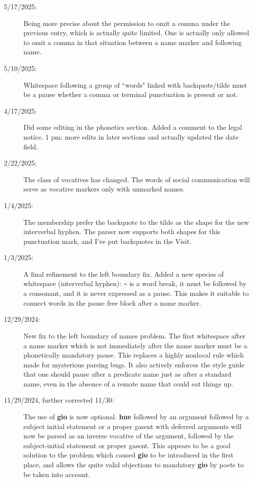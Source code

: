 \documentclass[12pt]{book}
\begin{document}
\begin{description}

\item[5/17/2025:]  Being more precise about the permission to omit a comma under the previous entry, which is actually quite limited.  One is actually only allowed to omit a comma in that situation between a name marker and following name.

\item[5/10/2025:]  Whitespace following a group of ``words" linked with backquote/tilde must be a pause whether a comma or terminal punctuation is present or not.

\item[4/17/2025:]  Did some editing in the phonetics section.  Added a comment to the legal notice.  1 pm:  more edits in later sections and actually updated the date field.

\item[2/22/2025:]  The class of vocatives has changed.  The words of social communication will serve as vocative markers only with unmarked names.

\item[1/4/2025:]  The membership prefer the backquote to the tilde as the shape for the new interverbal hyphen.  The parser now supports both shapes for this punctuation mark, and I've put backquotes in the Visit.

\item[1/3/2025:]  A final refinement to the left boundary fix.  Added a new species of whitespace (interverbal hyphen):  \verb|~| is a word break, it must be followed by a consonant, and it is never expressed as a pause.  This makes it suitable
to connect words in the pause free block after a name marker.

\item[12/29/2024:]  New fix to the left boundary of names problem.  The first whitespace after a name marker which is not immediately after the name marker must be a phonetically mandatory pause.  This replaces a highly nonlocal rule which made for mysterious parsing bugs.  It also actively enforces the style guide that one should pause after a predicate name just as after a standard name, even in the absence of a remote name that could eat things up.

\item[11/29/2024, further corrected 11/30:]  The use of {\bf gio} is now optional.  {\bf hue} followed by an argument followed by a subject initial statement or a proper gasent with deferred arguments will now be parsed as an inverse vocative of the argument, followed by the subject-initial statement or proper gasent.  This appears to be a good solution to the problem which caused {\bf gio} to be introduced in the first place, and allows the quite valid objections to mandatory {\bf gio} by poets to be taken into account.


\end{description}
\end{document}
